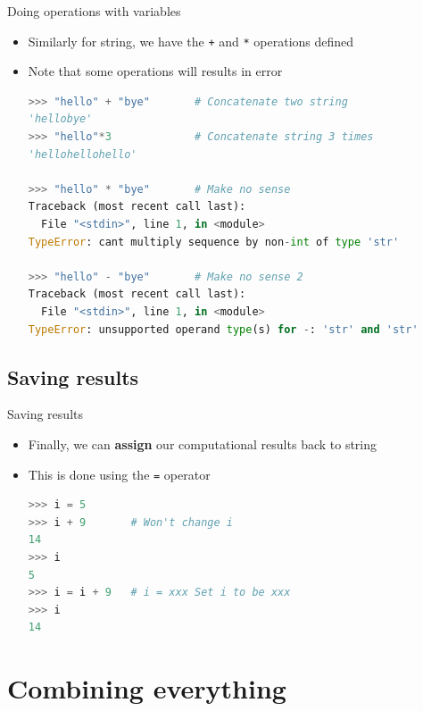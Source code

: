 \documentclass[10pt,xcolor={table,dvipsnames},t]{beamer}
\begin{document}
\begin{frame}[fragile]{Doing operations with variables}
  \begin{itemize}
    \item Similarly for string, we have the \texttt{+} and \texttt{*} operations defined 
    \item Note that some operations will results in error
\begin{lstlisting}[language=python]
>>> "hello" + "bye"       # Concatenate two string 
'hellobye'
>>> "hello"*3             # Concatenate string 3 times
'hellohellohello' 

>>> "hello" * "bye"       # Make no sense
Traceback (most recent call last):
  File "<stdin>", line 1, in <module>
TypeError: cant multiply sequence by non-int of type 'str'

>>> "hello" - "bye"       # Make no sense 2
Traceback (most recent call last):
  File "<stdin>", line 1, in <module>
TypeError: unsupported operand type(s) for -: 'str' and 'str'
\end{lstlisting}
  \end{itemize}
\end{frame}

\subsection{Saving results}
\begin{frame}[fragile]{Saving results}
  \begin{itemize}
    \item Finally, we can \textbf{assign} our computational results back to string
    \item This is done using the \texttt{=} operator
\begin{lstlisting}[language=python]
>>> i = 5
>>> i + 9       # Won't change i
14
>>> i
5
>>> i = i + 9   # i = xxx Set i to be xxx
>>> i
14
\end{lstlisting}
  \end{itemize}
\end{frame}

\section{Combining everything}
\end{document}
